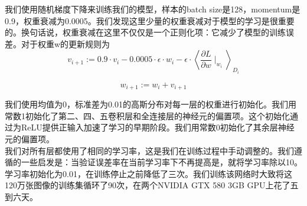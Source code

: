 我们使用随机梯度下降来训练我们的模型，样本的batch size是128，momentum是0.9，权重衰减为0.0005。我们发现这里少量的权重衰减对于模型的学习是很重要的。换句话说，权重衰减在这里不仅仅是一个正则化项：它减少了模型的训练误差。对于权重w的更新规则为\\
$$
v_{i+1} := 0.9 \cdot v_{i} - 0.0005\cdot \epsilon \cdot w_{i}-\epsilon \cdot \left \langle \frac{\partial L}{\partial w}\mid _{w_{i}} \right \rangle _{D_{i}}
$$

$$
w_{i+1}:=w_{i}+v_{i+1}
$$


我们使用均值为0，标准差为0.01的高斯分布对每一层的权重进行初始化。我们用常数1初始化了第二、四、五卷积层和全连接层的神经元的偏置项。这个初始化通过为ReLU提供正输入加速了学习的早期阶段。我们用常数0初始化了其余层神经元的偏置项。\\

我们对所有层都使用了相同的学习率，这是我们在训练过程中手动调整的。我们遵循的一些启发是：当验证误差率在当前学习率下不再提高是，就将学习率除以10。学习率初始化为0.01，在训练停止之前降低了三次。我们训练该网络时大致将这120万张图像的训练集循环了90次，在两个NVIDIA GTX 580 3GB GPU上花了五到六天。\\

